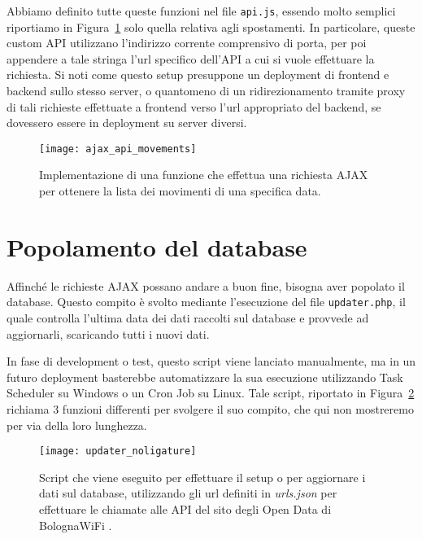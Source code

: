 Abbiamo definito tutte queste funzioni nel file \Verb_api.js_, essendo molto semplici riportiamo in Figura~\ref{fig:ajax_api_movements} solo quella relativa agli spostamenti. In particolare, queste custom API utilizzano l'indirizzo corrente comprensivo di porta, per poi appendere a tale stringa l'url specifico dell'API a cui si vuole effettuare la richiesta. Si noti come questo setup presuppone un deployment di frontend e backend sullo stesso server, o quantomeno di un ridirezionamento tramite proxy di tali richieste effettuate a frontend verso l'url appropriato del backend, se dovessero essere in deployment su server diversi.

\begin{figure}[H]
    \centering
    \texttt{[image: ajax\_api\_movements]}
    \caption[Richiesta AJAX per ottenere la lista dei movimenti]{Implementazione di una funzione che effettua una richiesta AJAX per ottenere la lista dei movimenti di una specifica data.}
    \label{fig:ajax_api_movements}
\end{figure}

\section{Popolamento del database}
Affinché le richieste AJAX possano andare a buon fine, bisogna aver popolato il database. Questo compito è svolto mediante l'esecuzione del file \Verb_updater.php_, il quale controlla l'ultima data dei dati raccolti sul database e provvede ad aggiornarli, scaricando tutti i nuovi dati.

In fase di development o test, questo script viene lanciato manualmente, ma in un futuro deployment basterebbe automatizzare la sua esecuzione utilizzando Task Scheduler su Windows o un Cron Job su Linux. Tale script, riportato in Figura~\ref{fig:updater} richiama 3 funzioni differenti per svolgere il suo compito, che qui non mostreremo per via della loro lunghezza.

\begin{figure}[H]
    \centering
    \texttt{[image: updater\_noligature]}
    \caption[Script per setup o aggiornamento di dati sul database]{Script che viene eseguito per effettuare il setup o per aggiornare i dati sul database, utilizzando gli url definiti in \textit{urls.json} per effettuare le chiamate alle API del sito degli Open Data di BolognaWiFi \cite{BolognaWiFi_Spostamenti,BolognaWiFi_Affollamento,BolognaWiFi_Affluenza}.}
    \label{fig:updater}
\end{figure}

